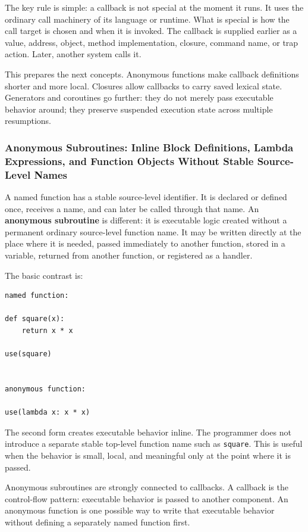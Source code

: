 The key rule is simple: a callback is not special at the moment it runs. It uses the ordinary call machinery of its language or runtime. What is special is how the call target is chosen and when it is invoked. The callback is supplied earlier as a value, address, object, method implementation, closure, command name, or trap action. Later, another system calls it.

This prepares the next concepts. Anonymous functions make callback definitions shorter and more local. Closures allow callbacks to carry saved lexical state. Generators and coroutines go further: they do not merely pass executable behavior around; they preserve suspended execution state across multiple resumptions.


\subsubsection{Anonymous Subroutines: Inline Block Definitions, Lambda Expressions, and Function Objects Without Stable Source-Level Names}

A named function has a stable source-level identifier. It is declared or defined once, receives a name, and can later be called through that name. An \textbf{anonymous subroutine} is different: it is executable logic created without a permanent ordinary source-level function name. It may be written directly at the place where it is needed, passed immediately to another function, stored in a variable, returned from another function, or registered as a handler.

The basic contrast is:

\begin{verbatim}
named function:

def square(x):
    return x * x

use(square)


anonymous function:

use(lambda x: x * x)
\end{verbatim}

The second form creates executable behavior inline. The programmer does not introduce a separate stable top-level function name such as \texttt{square}. This is useful when the behavior is small, local, and meaningful only at the point where it is passed.

Anonymous subroutines are strongly connected to callbacks. A callback is the control-flow pattern: executable behavior is passed to another component. An anonymous function is one possible way to write that executable behavior without defining a separately named function first.


